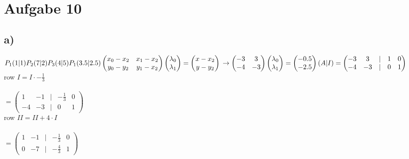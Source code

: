 \section*{Aufgabe 10}
\subsection*{a)}
$
P_1(1|1)\\
P_2(7|2)\\
P_3(4|5)\\
P_1(3.5|2.5)\\
\begin{pmatrix}
x_0 - x_2 & x_1 - x_2 \\
y_0 - y_2 & y_1 - x_2 
\end{pmatrix}
\begin{pmatrix}
\lambda_0 \\
\lambda_1
\end{pmatrix}
=
\begin{pmatrix}
x - x_2 \\
y - y_2
\end{pmatrix}\\
\rightarrow
\begin{pmatrix}
-3 & 3 \\
-4 & -3 
\end{pmatrix}
\begin{pmatrix}
\lambda_0 \\
\lambda_1
\end{pmatrix}
=
\begin{pmatrix}
-0.5 \\
-2.5
\end{pmatrix}\\
(A | I) = 
\begin{pmatrix}
-3 & 3 & | & 1 & 0 \\
-4 & -3 & | & 0 & 1
\end{pmatrix}$\\
row $I = I \cdot -\frac{1}{3}$\\\\
$=
\begin{pmatrix}
1 & -1 & | & -\frac{1}{3} & 0 \\
-4 & -3 & | & 0 & 1 
\end{pmatrix}$\\
row $II = II + 4\cdot I$\\\\
$=
\begin{pmatrix}
1 & -1 & | & -\frac{1}{3} & 0 \\
0 & -7 & | & -\frac{4}{3} & 1 
\end{pmatrix}$\\
